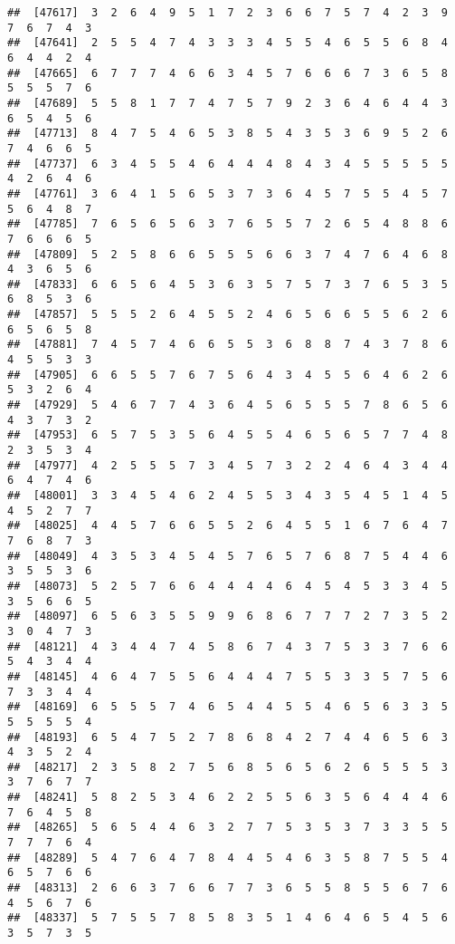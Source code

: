 \documentclass[
]{book}
\begin{document}
\begin{verbatim}
##  [47617]  3  2  6  4  9  5  1  7  2  3  6  6  7  5  7  4  2  3  9  7  6  7  4  3
##  [47641]  2  5  5  4  7  4  3  3  3  4  5  5  4  6  5  5  6  8  4  6  4  4  2  4
##  [47665]  6  7  7  7  4  6  6  3  4  5  7  6  6  6  7  3  6  5  8  5  5  5  7  6
##  [47689]  5  5  8  1  7  7  4  7  5  7  9  2  3  6  4  6  4  4  3  6  5  4  5  6
##  [47713]  8  4  7  5  4  6  5  3  8  5  4  3  5  3  6  9  5  2  6  7  4  6  6  5
##  [47737]  6  3  4  5  5  4  6  4  4  4  8  4  3  4  5  5  5  5  5  4  2  6  4  6
##  [47761]  3  6  4  1  5  6  5  3  7  3  6  4  5  7  5  5  4  5  7  5  6  4  8  7
##  [47785]  7  6  5  6  5  6  3  7  6  5  5  7  2  6  5  4  8  8  6  7  6  6  6  5
##  [47809]  5  2  5  8  6  6  5  5  5  6  6  3  7  4  7  6  4  6  8  4  3  6  5  6
##  [47833]  6  6  5  6  4  5  3  6  3  5  7  5  7  3  7  6  5  3  5  6  8  5  3  6
##  [47857]  5  5  5  2  6  4  5  5  2  4  6  5  6  6  5  5  6  2  6  6  5  6  5  8
##  [47881]  7  4  5  7  4  6  6  5  5  3  6  8  8  7  4  3  7  8  6  4  5  5  3  3
##  [47905]  6  6  5  5  7  6  7  5  6  4  3  4  5  5  6  4  6  2  6  5  3  2  6  4
##  [47929]  5  4  6  7  7  4  3  6  4  5  6  5  5  5  7  8  6  5  6  4  3  7  3  2
##  [47953]  6  5  7  5  3  5  6  4  5  5  4  6  5  6  5  7  7  4  8  2  3  5  3  4
##  [47977]  4  2  5  5  5  7  3  4  5  7  3  2  2  4  6  4  3  4  4  6  4  7  4  6
##  [48001]  3  3  4  5  4  6  2  4  5  5  3  4  3  5  4  5  1  4  5  4  5  2  7  7
##  [48025]  4  4  5  7  6  6  5  5  2  6  4  5  5  1  6  7  6  4  7  7  6  8  7  3
##  [48049]  4  3  5  3  4  5  4  5  7  6  5  7  6  8  7  5  4  4  6  3  5  5  3  6
##  [48073]  5  2  5  7  6  6  4  4  4  4  6  4  5  4  5  3  3  4  5  3  5  6  6  5
##  [48097]  6  5  6  3  5  5  9  9  6  8  6  7  7  7  2  7  3  5  2  3  0  4  7  3
##  [48121]  4  3  4  4  7  4  5  8  6  7  4  3  7  5  3  3  7  6  6  5  4  3  4  4
##  [48145]  4  6  4  7  5  5  6  4  4  4  7  5  5  3  3  5  7  5  6  7  3  3  4  4
##  [48169]  6  5  5  5  7  4  6  5  4  4  5  5  4  6  5  6  3  3  5  5  5  5  5  4
##  [48193]  6  5  4  7  5  2  7  8  6  8  4  2  7  4  4  6  5  6  3  4  3  5  2  4
##  [48217]  2  3  5  8  2  7  5  6  8  5  6  5  6  2  6  5  5  5  3  3  7  6  7  7
##  [48241]  5  8  2  5  3  4  6  2  2  5  5  6  3  5  6  4  4  4  6  7  6  4  5  8
##  [48265]  5  6  5  4  4  6  3  2  7  7  5  3  5  3  7  3  3  5  5  7  7  7  6  4
##  [48289]  5  4  7  6  4  7  8  4  4  5  4  6  3  5  8  7  5  5  4  6  5  7  6  6
##  [48313]  2  6  6  3  7  6  6  7  7  3  6  5  5  8  5  5  6  7  6  4  5  6  7  6
##  [48337]  5  7  5  5  7  8  5  8  3  5  1  4  6  4  6  5  4  5  6  3  5  7  3  5

\end{verbatim}
\end{document}
